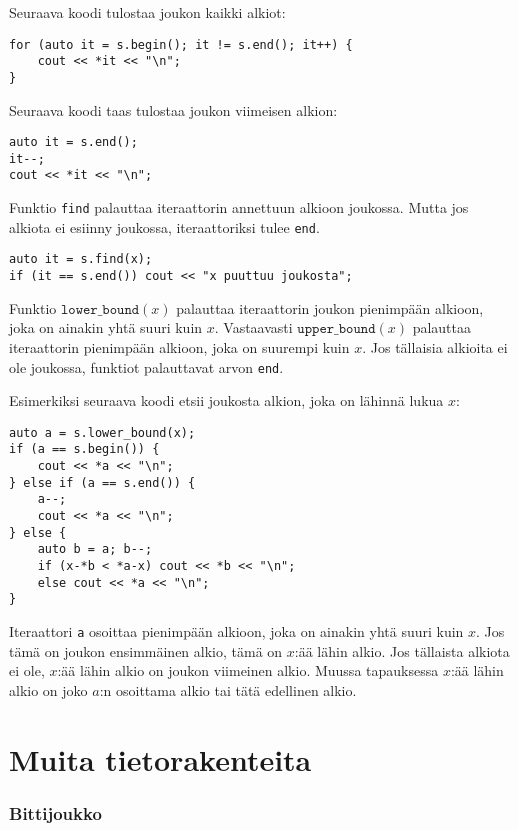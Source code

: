 Seuraava koodi tulostaa joukon kaikki alkiot:

\begin{lstlisting}
for (auto it = s.begin(); it != s.end(); it++) {
    cout << *it << "\n";
}
\end{lstlisting}
Seuraava koodi taas tulostaa joukon
viimeisen alkion:

\begin{lstlisting}
auto it = s.end();
it--;
cout << *it << "\n";
\end{lstlisting}

Funktio \texttt{find} palauttaa iteraattorin
annettuun alkioon joukossa.
Mutta jos alkiota ei esiinny joukossa,
iteraattoriksi tulee \texttt{end}.

\begin{lstlisting}
auto it = s.find(x);
if (it == s.end()) cout << "x puuttuu joukosta";
\end{lstlisting}

Funktio $\texttt{lower\_bound}(x)$ palauttaa
iteraattorin joukon pienimpään alkioon,
joka on ainakin yhtä suuri kuin $x$.
Vastaavasti $\texttt{upper\_bound}(x)$ palauttaa
iteraattorin pienimpään alkioon,
joka on suurempi kuin $x$.
Jos tällaisia alkioita ei ole joukossa,
funktiot palauttavat arvon \texttt{end}.

Esimerkiksi seuraava koodi etsii joukosta
alkion, joka on lähinnä lukua $x$:

\begin{lstlisting}
auto a = s.lower_bound(x);
if (a == s.begin()) {
    cout << *a << "\n";
} else if (a == s.end()) {
    a--;
    cout << *a << "\n";
} else {
    auto b = a; b--;
    if (x-*b < *a-x) cout << *b << "\n";
    else cout << *a << "\n";
}
\end{lstlisting}
Iteraattori \texttt{a}
osoittaa pienimpään alkioon,
joka on ainakin yhtä suuri kuin $x$.
Jos tämä on joukon ensimmäinen alkio,
tämä on $x$:ää lähin alkio.
Jos tällaista alkiota ei ole,
$x$:ää lähin alkio on joukon viimeinen alkio.
Muussa tapauksessa $x$:ää lähin alkio
on joko $a$:n osoittama alkio tai tätä edellinen alkio.

\section{Muita tietorakenteita}

\subsubsection{Bittijoukko}

